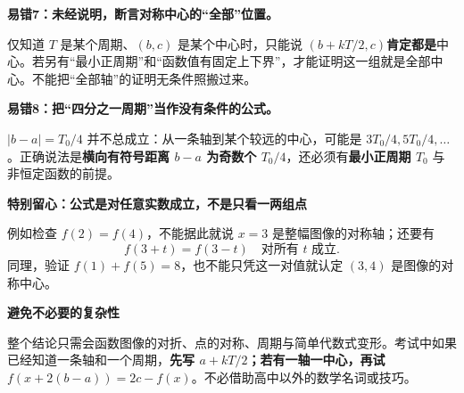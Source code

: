 \clearpage
\begin{trapbox}
\textbf{\textcolor{CTrap}{易错7：未经说明，断言对称中心的“全部”位置。}}



仅知道 $T$ 是某个周期、$(b,c)$ 是某个中心时，只能说 $(b+kT/2,c)$\textbf{肯定都是}中心。若另有“最小正周期”和“函数值有固定上下界”，才能证明这一组就是全部中心。不能把“全部轴”的证明无条件照搬过来。



\end{trapbox}
\clearpage
\begin{trapbox}
\textbf{\textcolor{CTrap}{易错8：把“四分之一周期”当作没有条件的公式。}}



$|b-a|=T_0/4$ 并不总成立：从一条轴到某个较远的中心，可能是 $3T_0/4,5T_0/4,\ldots$。正确说法是\textbf{横向有符号距离 $b-a$ 为奇数个 $T_0/4$}，还必须有\textbf{最小正周期 $T_0$} 与非恒定函数的前提。



\medskip
\end{trapbox}\clearpage\begin{trapbox}

\textbf{\textcolor{CTrap}{特别留心：公式是对任意实数成立，不是只看一两组点}}

例如检查 $f(2)=f(4)$，不能据此就说 $x=3$ 是整幅图像的对称轴；还要有
\[
f(3+t)=f(3-t)\quad\text{对所有 $t$ 成立}.
\]
同理，验证 $f(1)+f(5)=8$，也不能只凭这一对值就认定 $(3,4)$ 是图像的对称中心。

\medskip
\textbf{\textcolor{CTrap}{避免不必要的复杂性}}

整个结论只需会函数图像的对折、点的对称、周期与简单代数式变形。考试中如果已经知道一条轴和一个周期，\textbf{先写 $a+kT/2$；若有一轴一中心，再试 $f(x+2(b-a))=2c-f(x)$}。不必借助高中以外的数学名词或技巧。
\end{trapbox}
